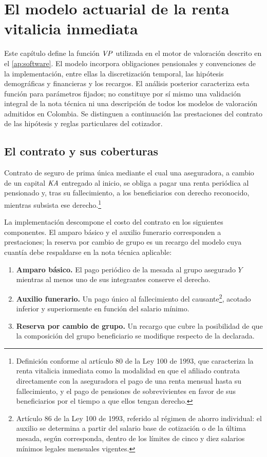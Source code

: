 \chapter{El modelo actuarial de la renta vitalicia inmediata}
\label{cap:modelo}

Este capítulo define la función $\mathit{VP}$ utilizada en el motor de valoración
descrito en el \cref{ap:software}. El modelo incorpora obligaciones pensionales
y convenciones de la implementación, entre ellas la discretización temporal,
las hipótesis demográficas y financieras y los recargos. El análisis posterior
caracteriza esta función para parámetros fijados; no constituye por sí mismo
una validación integral de la nota técnica ni una descripción de todos los
modelos de valoración admitidos en Colombia. Se distinguen a continuación las
prestaciones del contrato de las hipótesis y reglas particulares del cotizador.

\section{El contrato y sus coberturas}

\begin{definition}
Contrato de seguro de prima única mediante el cual una aseguradora, a cambio de un
capital $\mathit{KA}$ entregado al inicio, se obliga a pagar una renta periódica al
pensionado y, tras su fallecimiento, a los beneficiarios con derecho reconocido,
mientras subsista ese derecho.\footnote{Definición conforme al artículo 80 de la Ley 100 de 1993, que caracteriza la renta vitalicia inmediata como la modalidad en que el afiliado contrata directamente con la aseguradora el pago de una renta mensual hasta su fallecimiento, y el pago de pensiones de sobrevivientes en favor de sus beneficiarios por el tiempo a que ellos tengan derecho.}
\end{definition}

La implementación descompone el costo del contrato en los siguientes
componentes. El amparo básico y el auxilio funerario corresponden a prestaciones;
la reserva por cambio de grupo es un recargo del modelo cuya cuantía debe
respaldarse en la nota técnica aplicable:

\begin{enumerate}[leftmargin=*]
  \item \textbf{Amparo básico.} El pago periódico de la mesada al grupo asegurado
        $Y$ mientras al menos uno de sus integrantes conserve el derecho.
  \item \textbf{Auxilio funerario.} Un pago único al fallecimiento del causante\footnote{Artículo 86 de la Ley 100 de 1993, referido al régimen de ahorro individual: el auxilio se determina a partir del salario base de cotización o de la última mesada, según corresponda, dentro de los límites de cinco y diez salarios mínimos legales mensuales vigentes.},
        acotado inferior y superiormente en función del salario mínimo.
  \item \textbf{Reserva por cambio de grupo.} Un recargo que cubre la posibilidad
        de que la composición del grupo beneficiario se modifique respecto de la
        declarada.
\end{enumerate}

